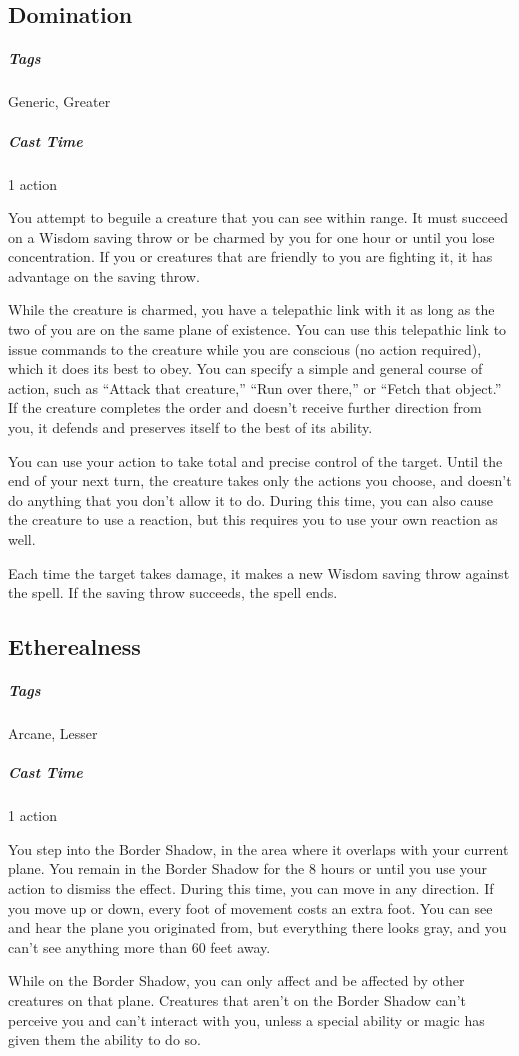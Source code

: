 \subsection{Domination}\label{spell:domination}
\subparagraph*{Tags} Generic, Greater
\subparagraph*{Cast Time} 1 action

You attempt to beguile a creature that you can see within range. It must succeed on a Wisdom saving throw or be charmed by you for one hour or until you lose concentration. If you or creatures that are friendly to you are fighting it, it has advantage on the saving throw.

While the creature is charmed, you have a telepathic link with it as long as the two of you are on the same plane of existence. You can use this telepathic link to issue commands to the creature while you are conscious (no action required), which it does its best to obey. You can specify a simple and general course of action, such as “Attack that creature,” “Run over there,” or “Fetch that object.” If the creature completes the order and doesn't receive further direction from you, it defends and preserves itself to the best of its ability.

You can use your action to take total and precise control of the target. Until the end of your next turn, the creature takes only the actions you choose, and doesn't do anything that you don't allow it to do. During this time, you can also cause the creature to use a reaction, but this requires you to use your own reaction as well.

Each time the target takes damage, it makes a new Wisdom saving throw against the spell. If the saving throw succeeds, the spell ends.

\subsection{Etherealness}\label{spell:etherealness}
\subparagraph*{Tags} Arcane, Lesser
\subparagraph*{Cast Time} 1 action

You step into the Border Shadow, in the area where it overlaps with your current plane. You remain in the Border Shadow for the 8 hours or until you use your action to dismiss the effect. During this time, you can move in any direction. If you move up or down, every foot of movement costs an extra foot. You can see and hear the plane you originated from, but everything there looks gray, and you can't see anything more than 60 feet away.

While on the  Border Shadow, you can only affect and be affected by other creatures on that plane. Creatures that aren't on the Border Shadow can't perceive you and can't interact with you, unless a special ability or magic has given them the ability to do so.

